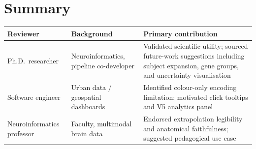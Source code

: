\documentclass[11pt,letterpaper]{article}
\begin{document}
\section{Summary}

\begin{center}
\begin{tabular}{p{3.2cm} p{3.5cm} p{6.5cm}}
\hline
\textbf{Reviewer} & \textbf{Background} & \textbf{Primary contribution} \\
\hline
Ph.D.\ researcher & Neuroinformatics, pipeline co-developer &
  Validated scientific utility; sourced future-work suggestions including
  subject expansion, gene groups, and uncertainty visualisation \\[4pt]
Software engineer & Urban data / geospatial dashboards &
  Identified colour-only encoding limitation; motivated click tooltips
  and V5 analytics panel \\[4pt]
Neuroinformatics professor & Faculty, multimodal brain data &
  Endorsed extrapolation legibility and anatomical faithfulness; suggested
  pedagogical use case \\
\hline
\end{tabular}
\end{center}
\end{document}
